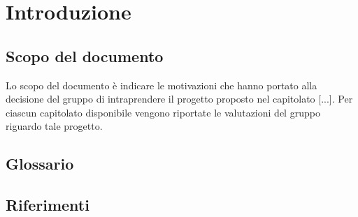 \section{Introduzione}
\subsection{Scopo del documento}
Lo scopo del documento è indicare le motivazioni che hanno portato alla decisione del gruppo di intraprendere il progetto proposto nel capitolato [...].
Per ciascun capitolato disponibile vengono riportate le valutazioni del gruppo riguardo tale progetto.
\subsection{Glossario}

\subsection{Riferimenti}
